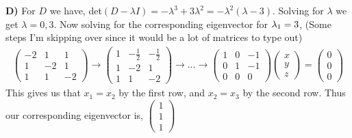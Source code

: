 \documentclass[12pt]{article}
\begin{document}
    \textbf{D)} For $D$ we have, det$(D - \lambda I) = -\lambda^3 + 3\lambda^2 = -\lambda^2(\lambda - 3)$. Solving for $\lambda$ we get $\lambda = 0,3$.
\newpage
    Now solving for the corresponding eigenvector for ${\lambda}_1 = 3$, (Some steps I'm skipping over since it would be a lot of matrices to type out)
    \begin{align*}
        \begin{pmatrix}
            -2 & 1 & 1 \\
            1 & -2 & 1 \\
            1 & 1 & -2
        \end{pmatrix} \rightarrow \begin{pmatrix}
            1 & -\frac{1}{2} & -\frac{1}{2} \\
            1 & -2 & 1 \\ 
            1 & 1 & -2
        \end{pmatrix} \rightarrow \dots \rightarrow \begin{pmatrix}
            1 & 0 & -1 \\ 0 & 1 & -1 \\ 0 & 0 & 0
        \end{pmatrix}\begin{pmatrix}
            x \\ y \\ z
        \end{pmatrix} = \begin{pmatrix}
            0 \\ 0 \\ 0
        \end{pmatrix}
    \end{align*}
    This gives us that $x_1 = x_2$ by the first row, and $x_2 = x_3$ by the second row. Thus our corresponding eigenvector is, $\begin{pmatrix}
        1 \\ 1 \\ 1
    \end{pmatrix}$
\end{document}
